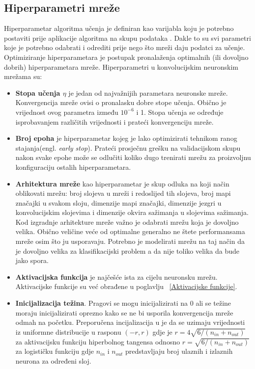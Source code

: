 \documentclass[times, utf8, zavrsni, numeric]{fer}
\begin{document}
\subsection{Hiperparametri mreže}
Hiperparametar algoritma učenja je definiran kao varijabla koju je potrebno postaviti prije aplikacije algoritma na skupu podataka \citep{bengio2012practical}. Dakle to su svi parametri koje je potrebno odabrati i odrediti prije nego što mreži daju podatci za učenje. Optimiziranje hiperparametara je postupak pronalaženja optimalnih (ili dovoljno dobrih) hiperparametara mreže. Hiperparametri u konvolucijskim neuronskim mrežama su:
\begin{itemize}
\renewcommand\labelitemi{$\bullet$}
\item \textbf{Stopa učenja $\eta$} je jedan od najvažnijih parametara neuronske mreže. Konvergencija mreže ovisi o pronalasku dobre stope učenja. Obično je vrijednost ovog parametra između $10^{-6}$ i 1. Stopa učenja se određuje isprobavanjem različitih vrijednosti i prateći konvergenciju mreže.

\item \textbf{Broj epoha} je hiperparametar kojeg je lako optimizirati tehnikom ranog stajanja(engl. \textit{early stop}). Prateći prosječnu grešku na validacijskom skupu nakon svake epohe može se odlučiti koliko dugo trenirati mrežu za proizvoljnu konfiguraciju ostalih hiperparametara.

\item \textbf{Arhitektura mreže} kao hiperparametar je skup odluka na koji način oblikovati mrežu: broj slojeva u mreži i redoslijed tih slojeva, broj mapi značajki u svakom sloju, dimenzije mapi značajki,
dimenzije jezgri u konvolucijskim slojevima i dimenzije okvira sažimanja u slojevima sažimanja. Kod izgradnje arhitekture mreže važno je odabrati mrežu koja je dovoljno velika. Obično veličine veće od optimalne generalno ne štete performansama mreže osim što ju usporavaju. Potrebno je modelirati mrežu na taj način da je dovoljno velika za klasifikacijski problem a da nije toliko velika da bude jako spora.

\item \textbf{Aktivacijska funkcija} je najčešće ista za cijelu neuronsku mrežu. Aktivacijske funkcije su već obrađene u poglavlju ~\ref{Aktivacijske funkcije}. 

\item \textbf{Inicijalizacija težina}. Pragovi se mogu inicijalizirati na 0 ali se težine moraju inicijalizirati oprezno kako se ne bi usporila konvergencija mreže odmah na početku. Preporučena incijalizacija u \citep{glorot2010understanding} je da se uzimaju vrijednosti iz uniformne distribucije u rasponu $(-r, r)$ gdje je $r = 4\sqrt{6/(n_{in} + n_{out})}$ za aktivacijsku funkciju hiperbolnog tangensa odnosno $r = \sqrt{6/(n_{in} + n_{out})}$ za logističku funkciju gdje $n_{in}$ i $n_{out}$ predstavljaju broj ulaznih i izlaznih neurona za određeni sloj.


\end{itemize}
\end{document}

